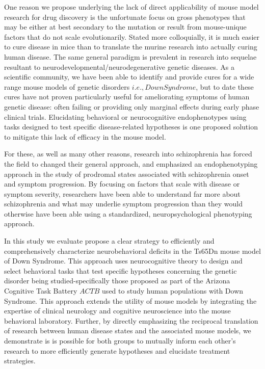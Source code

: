 \documentclass{article}
\begin{document}
One reason we propose underlying the lack of direct applicability of mouse model research for drug discovery is the unfortunate focus on gross phenotypes that may be either at best secondary to the mutation or result from mouse-unique factors that do not scale evolutionarily. Stated more colloquially, it is much easier to cure disease in mice than to translate the murine research into actually curing human disease. The same general paradigm is prevalent in research into sequelae resultant to neurodevelopmental/neurodegenerative genetic diseases. As a scientific community, we have been able to identify and provide cures for a wide range mouse models of genetic disorders \(i.e., Down Syndrome\), but to date these cures have not proven particularly useful for ameliorating symptoms of human genetic disease: often failing or providing only marginal effects during early phase clinical trials. Elucidating behavioral or neurocognitive endophenotypes using tasks designed to test specific disease-related hypotheses is one proposed solution to mitigate this lack of efficacy in the mouse model.

For these, as well as many other reasons, research into schizophrenia has forced the field to changed their general approach, and emphasized an endophenotyping approach in the study of prodromal states associated with schizophrenia onset and symptom progression. By focusing on factors that scale with disease or symptom severity, researchers have been able to understand far more about schizophrenia and what may underlie symptom progression than they would otherwise have been able using a standardized, neuropsychological phenotyping approach.

In this study we evaluate propose a clear strategy to efficiently and comprehensively characterize neurobehavioral deficits in the Ts65Dn mouse model of Down Syndrome. This approach uses neurocognitive theory to design and select behavioral tasks that test specific hypotheses concerning the genetic disorder being studied-specifically those proposed as part of the Arizona Cognitive Task Battery \(ACTB\) used to study human populations with Down Syndrome. This approach extends the utility of mouse models by integrating the expertise of clinical neurology and cognitive neuroscience into the mouse behavioral laboratory. Further, by directly emphasizing the reciprocal translation of research between human disease states and the associated mouse models, we demonstrate is is possible for both groups to mutually inform each other’s research to more efficiently generate hypotheses and elucidate treatment strategies.
\end{document}
